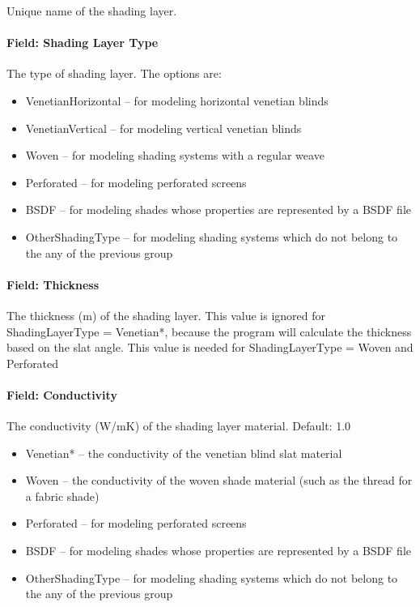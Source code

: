 Unique name of the shading layer.

\paragraph{Field: Shading Layer Type}\label{field-shading-layer-type}

The type of shading layer. The options are:

\begin{itemize}
\item
  VenetianHorizontal -- for modeling horizontal venetian blinds
\item
  VenetianVertical -- for modeling vertical venetian blinds
\item
  Woven -- for modeling shading systems with a regular weave
\item
  Perforated -- for modeling perforated screens
\item
  BSDF -- for modeling shades whose properties are represented by a BSDF file
\item
  OtherShadingType -- for modeling shading systems which do not belong to the any of the previous group
\end{itemize}

\paragraph{Field: Thickness}\label{field-thickness-7}

The thickness (m) of the shading layer. This value is ignored for ShadingLayerType = Venetian*, because the program will calculate the thickness based on the slat angle. This value is needed for ShadingLayerType = Woven and Perforated

\paragraph{Field: Conductivity}\label{field-conductivity-4}

The conductivity (W/mK) of the shading layer material. Default: 1.0

\begin{itemize}
\item
  Venetian* -- the conductivity of the venetian blind slat material
\item
  Woven -- the conductivity of the woven shade material (such as the thread for a fabric shade)
\item
  Perforated -- for modeling perforated screens
\item
  BSDF -- for modeling shades whose properties are represented by a BSDF file
\item
  OtherShadingType -- for modeling shading systems which do not belong to the any of the previous group
\end{itemize}

